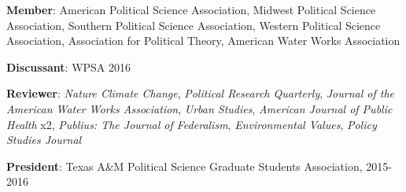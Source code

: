 \documentclass[margin]{res} %
\begin{document}
\begin{resume}
 \begin{hangparas}{.25in}{1} \textbf{Member}: American Political Science Association, Midwest Political Science Association, Southern Political Science Association, Western Political Science Association, Association for Political Theory, American Water Works Association

\textbf{Discussant}: WPSA 2016

\textbf{Reviewer}: \textit{Nature Climate Change}, \textit{Political Research Quarterly}, \textit{Journal of the American Water Works Association},  \textit{Urban Studies}, \textit{American Journal of Public Health} x2, \textit{Publius: The Journal of Federalism}, \textit{Environmental Values}, \textit{Policy Studies Journal}

\textbf{President}: Texas A\&M Political Science Graduate Students Association, 2015-2016 \end{hangparas}










\end{resume}
\end{document}
